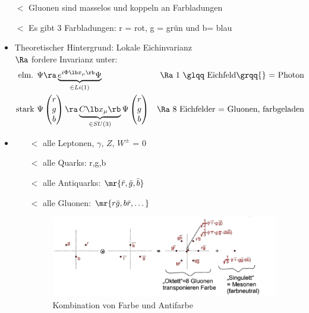 \begin{itemize}
\item[$\lt$] Gluonen sind masselos und koppeln an Farbladungen
\item[$\lt$] Es gibt 3 Farbladungen: r = rot, g = grün und b= blau
\item Theoretischer Hintergrund: Lokale Eichinvarianz\\
$\Ra$ fordere Invarianz unter:
\begin{align}
\text{elm. } & \Psi \ra \underbrace{e^{i\Phi\lb x_\mu\rb  } \Psi}_{\in Li(1)} & \Ra \ 1 \text{ \glqq Eichfeld\grqq{} = Photon}\\
\text{stark } & \Psi \begin{pmatrix}
r\\g\\b\end{pmatrix} \ra \underbrace{C\lb x_\mu\rb }_{\in SU(3)} \Psi \begin{pmatrix}r\\g\\b\end{pmatrix} & \Ra \ 8 \text{ Eichfelder = Gluonen, farbgeladen}
\end{align}
\item {}
\begin{itemize}
\item[$\lt$] alle Leptonen, $\gamma$, $Z$, $W^{\pm}$ = 0
\item[$\lt$] alle Quarks: r,g,b
\item[$\lt$] alle Antiquarks: $\mr{\bar{r}, \bar{g}, \bar{b}}$
\item[$\lt$] alle Gluonen: $\mr{r\bar{g}, b \bar{r}, \dots}$
\newpage
\begin{figure}[!ht]
\centering
\includegraphics[width=.75\textwidth]{imgs/ep5-fig-7-2.pdf}
\caption{Kombination von Farbe und Antifarbe\label{fig:7.2}}
\end{figure}


\end{itemize}
\end{itemize}
